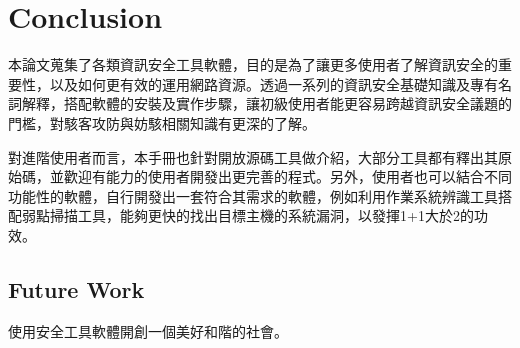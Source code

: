 \newpage
\chapter{Conclusion}

本論文蒐集了各類資訊安全工具軟體，目的是為了讓更多使用者了解資訊安全的重要性，以及如何更有效的運用網路資源。透過一系列的資訊安全基礎知識及專有名詞解釋，搭配軟體的安裝及實作步驟，讓初級使用者能更容易跨越資訊安全議題的門檻，對駭客攻防與妨駭相關知識有更深的了解。

對進階使用者而言，本手冊也針對開放源碼工具做介紹，大部分工具都有釋出其原始碼，並歡迎有能力的使用者開發出更完善的程式。另外，使用者也可以結合不同功能性的軟體，自行開發出一套符合其需求的軟體，例如利用作業系統辨識工具搭配弱點掃描工具，能夠更快的找出目標主機的系統漏洞，以發揮1+1大於2的功效。

\section{Future Work} 
使用安全工具軟體開創一個美好和階的社會。
